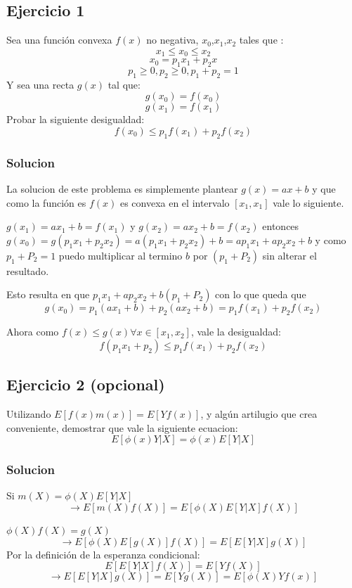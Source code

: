 \documentclass[12pt, a4paper]{article}
\begin{document}
\subsection{Ejercicio 1}

Sea una función convexa $f(x)$ no negativa, $x_0$,$x_1$,$x_2$ tales que :
 		$$x_1 \leq x_0 \leq x_2$$
		$$x_0 = p_1 x_1 + p_2 x$$
		$$p_1 \geq 0, p_2 \geq 0, p_1+p_2 = 1 $$
Y sea una recta $g(x)$ tal que:
		$$g(x_0) = f(x_0)$$
		$$g(x_1) = f(x_1)$$
Probar la siguiente desigualdad:
		$$f(x_0) \leq p_1f(x_1) + p_2f(x_2)$$

\subsubsection{Solucion}
La solucion de este problema es simplemente plantear $g(x) = ax+b$ y que como la función es  $f(x)$ es convexa en el intervalo $[x_1, x_1]$ vale lo siguiente.

$g(x_1) = ax_1+b = f(x_1) $ y $g(x_2) = ax_2+b = f(x_2) $ entonces $g(x_0) = g(p_1x_1+p_2x_2)=a(p_1x_1+p_2x_2)+b = ap_1x_1+ap_2x_2+b$ y como $p_1+P_2=1$ puedo multiplicar al termino $b$ por $(p_1+P_2)$ sin alterar el resultado.

Esto resulta en que $p_1x_1+ap_2x_2+b(p_1+P_2)$ con lo que queda que
	$$g(x_0) = p_1(ax_1+b)+p_2(ax_2+b) = p_1f(x_1)+p_2f(x_2)$$

Ahora como $f(x) \leq g(x) \forall x \in [x_1,x_2]$, vale la desigualdad:
	$$f(p_1 x_1 + p_2) \leq p_1f(x_1)+p_2f(x_2)$$

\subsection{Ejercicio 2 (opcional)}

Utilizando $E[f(x)m(x)] = E[Yf(x)]$, y algún artilugio que crea conveniente, demostrar que vale la siguiente ecuacion:
		$$E[\phi(x)Y|X] = \phi(x)E[Y|X]$$
\subsubsection{Solucion}

Si $m(X) = \phi(X)E[Y|X]$
		\begin{equation}
			\to E[m(X)f(X)] = E[\phi(X)E[Y|X]f(X)]
		\end{equation}

		$\phi(X)f(X) = g(X)$
		$$\to E[\phi(X)E[g(X)]f(X)] = E[E[Y|X]g(X)]$$
Por la definición de la esperanza condicional:
	 	$$E[E[Y|X]f(X)] = E[Yf(X)]$$
		\begin{equation}
			\to E[E[Y|X]g(X)] = E[Yg(X)] = E[\phi(X)Yf(x)]
		\end{equation}
\end{document}
